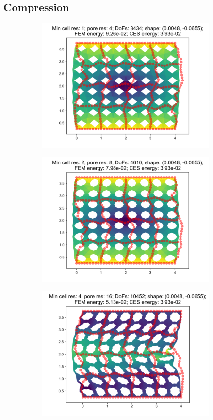 \subsection{Compression}
\begin{figure}[H]
\begin{subfigure}{.45\textwidth}
  \centering
  \includegraphics[width=.8\linewidth]{lces/vis_compression/bm_0_mesh_0.png}
\end{subfigure}
\begin{subfigure}{.45\textwidth}
  \centering
  \includegraphics[width=.8\linewidth]{lces/vis_compression/bm_0_mesh_1.png}
\end{subfigure}
\newline
\begin{subfigure}{.45\textwidth}
  \centering
  \includegraphics[width=.8\linewidth]{lces/vis_compression/bm_0_mesh_2.png}

\end{subfigure}
\end{figure}
